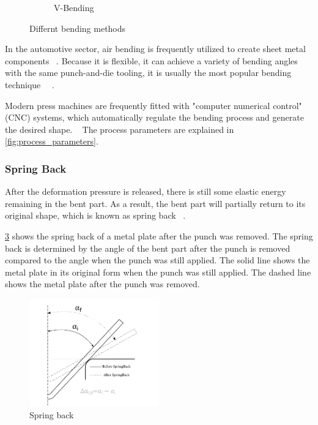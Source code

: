 \begin{figure}[h]
\begin{tcolorbox}[arc=0pt,boxrule=0.5pt, colback=white]
\begin{subfigure}{0.4\textwidth}
            \caption{V-Bending}
            \label{fig:v-bending}
        \end{subfigure}
        \hfill
    \end{tcolorbox}
    \caption{Differnt bending methods~\cite[pp. 416]{groover2020fundamentals}}
    \label{fig:bending-methods}
\end{figure}

In the automotive sector, air bending is frequently utilized to create sheet metal components
~\cite[p. 342]{kim2007prediction}.
Because it is flexible, it can achieve a variety of bending angles with the same punch-and-die tooling, it
is usually the most popular bending technique
~\cite[p. 3]{miranda_formingspringbackprediction_2018}~\cite[p. 1]{cruz2021application}.

Modern press machines are frequently fitted with "computer numerical control" (CNC) systems, which automatically
regulate the bending process and generate the desired shape.
~\cite[p. 3]{miranda_formingspringbackprediction_2018}
The process parameters are explained in \cref{fig:process_parameters}.

\subsubsection{Spring Back}\label{subsubsec:spring-back}
After the deformation pressure is released, there is still
some elastic energy remaining in the bent part.
As a result, the bent part will partially return to its original
shape, which is known as spring back
~\cite[p. 413--414]{groover2020fundamentals}.

\cref{fig:spring-back} shows the spring back of a metal plate after the punch was removed.
The spring back is determined by the angle of the bent part after the punch is removed compared to the angle when
the punch was still applied.
The solid line shows the metal plate in its original form when the punch was still
applied.
The dashed line shows the metal plate after the punch was removed.

\begin{figure}[h]
    \centering
    \includegraphics[width=0.5\textwidth]{chap3/images/spring-back}
    \caption{Spring back~\cite[p. 5]{cruz2021application}}
    \label{fig:spring-back}
\end{figure}


